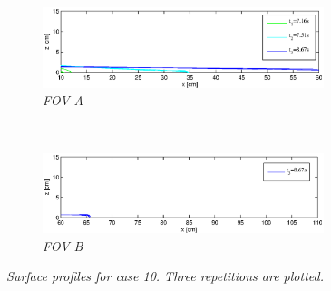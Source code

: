 \begin{figure}[]
        \centering
        \begin{subfigure}[]{0.4\textwidth}
                \includegraphics[width=0.9\textwidth]{./Figures/s_p_1A.eps}
                \caption*{\textit{FOV A}}
                \label{fig:overflate_10_1}
        \end{subfigure}
        ~ %
        \begin{subfigure}[]{0.4\textwidth}
                \includegraphics[width=0.9\textwidth]{./Figures/s_p_1B.eps}
               \caption*{\textit{FOV B}}
                \label{fig:overflate_10_2}
        \end{subfigure}
        \caption{\textit{Surface profiles for case 10. Three repetitions are plotted.}}
        \label{fig:runup_10}
\end{figure}

